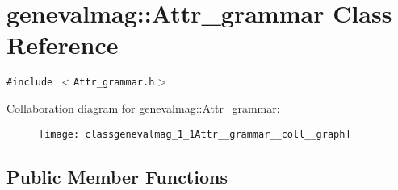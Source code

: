 \hypertarget{classgenevalmag_1_1Attr__grammar}{
\section{genevalmag::Attr\_\-grammar Class Reference}
\label{classgenevalmag_1_1Attr__grammar}
}
{\tt \#include $<$Attr\_\-grammar.h$>$}

Collaboration diagram for genevalmag::Attr\_\-grammar:\nopagebreak
\begin{figure}[H]
\begin{center}
\leavevmode
\texttt{[image: classgenevalmag\_1\_1Attr\_\_grammar\_\_coll\_\_graph]}
\end{center}
\end{figure}
\subsection*{Public Member Functions}
